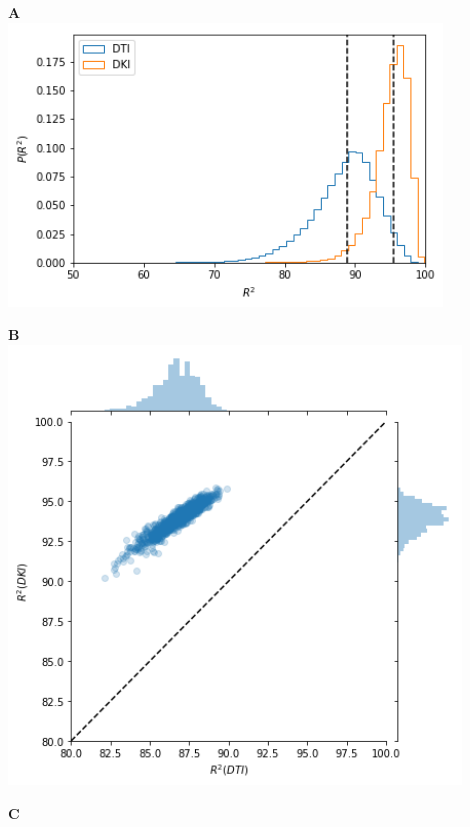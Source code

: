\documentclass[a0, landscape]{a0poster}
\begin{document}
\begin{multicols}{3}
\begin{minipage}[b]{1\linewidth}
  \large
  \begin{minipage}[b]{0.25\linewidth}
  \textbf{A}\\
  \includegraphics[width=11.5cm]{histogram_cod_dki_dti.png}
  \end{minipage}
\hfill
  \begin{minipage}[b]{0.25\linewidth}
  \textbf{B}\\
  \includegraphics[width=12cm]{cod_dti_dki.png}
  \end{minipage}
\hfill
  \begin{minipage}[b]{0.25\linewidth}
  \textbf{C}\\

\end{minipage}
\end{minipage}
\end{multicols}
\end{document}
